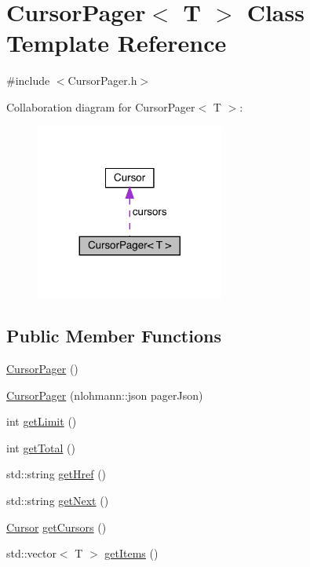 \hypertarget{class_cursor_pager}{}\section{Cursor\+Pager$<$ T $>$ Class Template Reference}
\label{class_cursor_pager}


{\ttfamily \#include $<$Cursor\+Pager.\+h$>$}



Collaboration diagram for Cursor\+Pager$<$ T $>$\+:
\nopagebreak
\begin{figure}[H]
\begin{center}
\leavevmode
\includegraphics[width=176pt]{class_cursor_pager__coll__graph}
\end{center}
\end{figure}
\subsection*{Public Member Functions}
\begin{DoxyCompactItemize}
\item 
\mbox{\hyperlink{class_cursor_pager_adb9af7ade4c6f7cc47f6176e6c3c8d3c}{Cursor\+Pager}} ()
\item 
\mbox{\hyperlink{class_cursor_pager_a945f2a56e865cd5fabb38ab674fa1999}{Cursor\+Pager}} (nlohmann\+::json pager\+Json)
\item 
int \mbox{\hyperlink{class_cursor_pager_a86d6a130611f6f35bc161a4bba7edba3}{get\+Limit}} ()
\item 
int \mbox{\hyperlink{class_cursor_pager_ad083974fd3d334f7133bc5b398d23ae2}{get\+Total}} ()
\item 
std\+::string \mbox{\hyperlink{class_cursor_pager_a47e9d35657bb8dd1f9b774946e7d7bac}{get\+Href}} ()
\item 
std\+::string \mbox{\hyperlink{class_cursor_pager_a3f2c0a7c6a44b3316b85febdc50c45ed}{get\+Next}} ()
\item 
\mbox{\hyperlink{class_cursor}{Cursor}} \mbox{\hyperlink{class_cursor_pager_af019ca0742e31c7e5c41eb1baf7b71eb}{get\+Cursors}} ()
\item 
std\+::vector$<$ T $>$ \mbox{\hyperlink{class_cursor_pager_a88246cd3876108a6483c10726d6f5682}{get\+Items}} ()
\end{DoxyCompactItemize}
